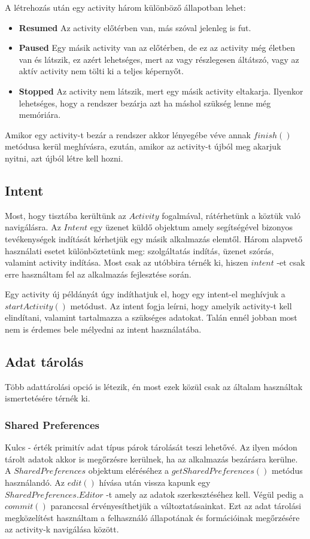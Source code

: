 \documentclass[12pt]{report}
\theoremstyle{definition}
\begin{document}
	A létrehozás után egy activity három különböző állapotban lehet:
	\begin{itemize}
		\item \textbf{Resumed} Az activity előtérben van, más szóval jelenleg is fut.
		\item \textbf{Paused} Egy másik activity van az előtérben, de ez az activity még életben van és látszik, ez azért lehetséges, mert az vagy részlegesen áltátszó, vagy az aktív activity nem tölti ki a teljes képernyőt.
		\item \textbf{Stopped} Az activity nem látszik, mert egy másik activity eltakarja. Ilyenkor lehetséges, hogy a rendszer bezárja azt ha máshol szükség lenne még memóriára.
	\end{itemize}
	
	Amikor egy activity-t bezár a rendszer akkor lényegébe véve annak  $finish\left(\right)$ metódusa kerül meghívásra, ezután, amikor az activity-t újból meg akarjuk nyitni, azt újból létre kell hozni.
	
	\subsection*{Intent}
	Most, hogy tisztába kerültünk az $Activity$ fogalmával, rátérhetünk a köztük való navigálásra. Az $Intent$ egy üzenet küldő objektum amely segítségével bizonyos tevékenységek indítását kérhetjük egy másik alkalmazás elemtől. Három alapvető használati esetet különböztetünk meg: szolgáltatás indítás, üzenet szórás, valamint activity indítása. Most csak az utóbbira térnék ki, hiszen $intent$ -et csak erre használtam fel az alkalmazás fejlesztése során.
	
	Egy activity új példányát úgy indíthatjuk el, hogy egy intent-el meghívjuk a \linebreak$startActivity\left(\right)$ metódust. Az intent fogja leírni, hogy amelyik activity-t kell elindítani, valamint tartalmazza a szükséges adatokat. Talán ennél jobban most nem is érdemes bele mélyedni az intent használatába.
	
	\subsection*{Adat tárolás}
	Több adattárolási opció is létezik, én most ezek közül csak az általam használtak ismertetésére térnék ki.
	
	\subsubsection{Shared Preferences}
	Kulcs - érték primitív adat típus párok tárolását teszi lehetővé. Az ilyen módon tárolt adatok akkor is megőrzésre kerülnek, ha az alkalmazás bezárásra kerülne. A \linebreak$SharedPreferences$ objektum eléréséhez a $getSharedPreferences\left(\right)$ metódus használandó. Az $edit\left(\right)$ hívása után vissza kapunk egy $SharedPreferences.Editor$ -t amely az adatok szerkesztéséhez kell. Végül pedig a $commit\left(\right)$ paranccsal érvényesíthetjük a változtatásainkat. Ezt az adat tárolási megközelítést használtam a felhasználó állapotának és formációinak megőrzésére az activity-k navigálása között.
	
\end{document}
